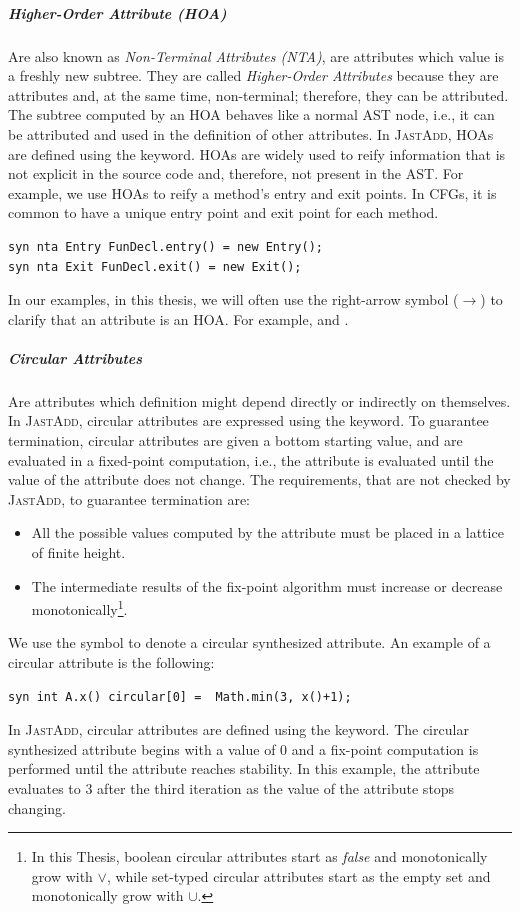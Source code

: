     \subparagraph*{Higher-Order Attribute (HOA)} Are also known as \emph{Non-Terminal Attributes (NTA)}, are attributes which
    value is a freshly new subtree. They are called \emph{Higher-Order Attributes}
    because they are attributes and, at the same time, non-terminal; therefore, they can be attributed.
    The subtree computed by an HOA behaves like a normal AST node, i.e., it can be
    attributed and used in the definition of other attributes. In \textsc{JastAdd}, HOAs
    are defined using the  keyword. HOAs are widely used to reify information
    that is not explicit in the source code and, therefore, not present in the AST.
    For example, we use HOAs to reify a method's entry and exit points. In CFGs, it
    is common to have a unique entry point and exit point for each method.
    \begin{lstlisting}[language=JastAdd]
syn nta Entry FunDecl.entry() = new Entry();
syn nta Exit FunDecl.exit() = new Exit();
    \end{lstlisting}
    In our examples, in this thesis, we will often use the right-arrow symbol (\textcolor{ATGsym}{$\rightarrow$}) to
    clarify that an attribute is an HOA. For example,  and .
    \subparagraph*{Circular Attributes}  Are attributes which definition might depend directly
    or indirectly on themselves. In \textsc{JastAdd}, circular attributes are expressed using the 
    keyword. To guarantee termination, circular attributes are given a bottom starting value, and are evaluated in a fixed-point
    computation, i.e., the attribute is evaluated until the value of the attribute does not change.
    The requirements, that are not checked by \textsc{JastAdd}, to guarantee termination are:
    \begin{itemize}
        \item All the possible values computed by the attribute must be placed
        in a lattice of finite height.
        \item The intermediate results of the fix-point algorithm must increase
        or decrease monotonically\footnote{In this Thesis, boolean circular attributes start
        as \emph{false} and monotonically grow with $\vee$, while set-typed circular attributes
        start as the empty set and monotonically grow with $\cup$.}.
    \end{itemize}
    We use the symbol  to denote a circular synthesized attribute.
    An example of a circular attribute is the following:
    \begin{lstlisting}[language=JastAdd]
syn int A.x() circular[0] =  Math.min(3, x()+1);
\end{lstlisting}
In \textsc{JastAdd}, circular attributes are defined using the  keyword.
The circular synthesized attribute  begins with a value of 0 and
a fix-point computation is performed until the attribute reaches stability. 
In this example, the attribute evaluates to 3 after the third iteration as 
the value of the attribute stops changing.



